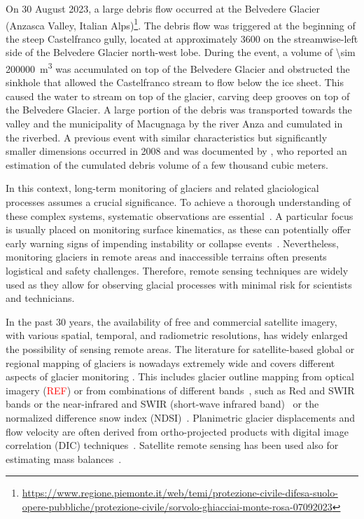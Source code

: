 On 30 August 2023, a large debris flow occurred at the Belvedere Glacier (Anzasca Valley, Italian Alps)\footnote{\url{https://www.regione.piemonte.it/web/temi/protezione-civile-difesa-suolo-opere-pubbliche/protezione-civile/sorvolo-ghiacciai-monte-rosa-07092023}}.
The debris flow was triggered at the beginning of the steep Castelfranco gully, located at approximately \SI{3600}{\masl} on the streamwise-left side of the Belvedere Glacier north-west lobe.
During the event, a volume of \SI{\sim 200000}{\cubic\meter} was accumulated on top of the Belvedere Glacier and obstructed the sinkhole that allowed the Castelfranco stream to flow below the ice sheet. 
This caused the water to stream on top of the glacier, carving deep grooves on top of the Belvedere Glacier. 
A large portion of the debris was transported towards the valley and the municipality of Macugnaga by the river Anza and cumulated in the riverbed.
A previous event with similar characteristics but significantly smaller dimensions occurred in 2008 and was documented by \cite{Mortara2009_ghiacciaoBelvedere}, who reported an estimation of the cumulated debris volume of a few thousand cubic meters.

In this context, long-term monitoring of glaciers and related glaciological processes assumes a crucial significance.
To achieve a thorough understanding of these complex systems, systematic observations are essential~\citep{Kaab2005}.
A particular focus is usually placed on monitoring surface kinematics, as these can potentially offer early warning signs of impending instability or collapse events~\citep{Faillettaz2015}.
Nevertheless, monitoring glaciers in remote areas and inaccessible terrains often presents logistical and safety challenges.
Therefore, remote sensing techniques are widely used as they allow for observing glacial processes with minimal risk for scientists and technicians. 

In the past 30 years, the availability of free and commercial satellite imagery, with various spatial, temporal, and radiometric resolutions, has widely enlarged the possibility of sensing remote areas.
The literature for satellite-based global or regional mapping of glaciers is nowadays extremely wide and covers different aspects of glacier monitoring \citep{Paul2007}. 
This includes glacier outline mapping from optical imagery (\textcolor{red}{REF}) or from combinations of different bands~\citep{Winsvold2016}, such as Red and SWIR bands or the near-infrared and SWIR (short-wave infrared band)~\citep{Paul_2002} or the normalized difference snow index (NDSI)~\citep{Hall1995}.
Planimetric glacier displacements and flow velocity are often derived from ortho-projected products with digital image correlation (DIC) techniques~\citep{Scambos1992, Kaab2005, Scherler2008, altena_kaab_2020}. 
Satellite remote sensing has been used also for estimating mass balances~\citep{Bamber2007, Berthier2016, Rabatel2017, Berthier2023}.

